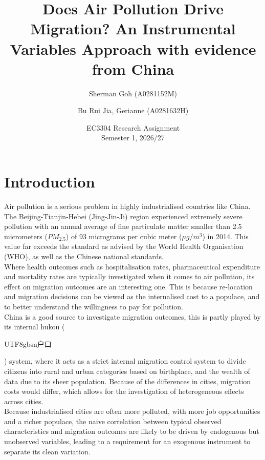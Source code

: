 \documentclass[11pt,twocolumn]{article}
\title{Does Air Pollution Drive Migration? An Instrumental Variables Approach with evidence from China}
\author{Sherman Goh (A0281152M) \and Bu Rui Jia, Gerianne (A0281632H)}
\date{EC3304 Research Assignment \\ Semester 1, 2026/27}
\begin{document}
\maketitle

\section{Introduction}

Air pollution is a serious problem in highly industrialised countries like China. The Beijing-Tianjin-Hebei (Jing-Jin-Ji) region experienced extremely severe pollution with an annual average of fine particulate matter smaller than 2.5 micrometers ($PM_{2.5}$) of 93 micrograms per cubic meter ($\mu g/m^3$) in 2014. This value far exceeds the standard as advised by the World Health Organisation (WHO), as well as the Chinese national standards. \citep{worldbank2020china}\\

\noindent  Where health outcomes such as hospitalisation rates, pharmaceutical expenditure and mortality rates \citep{schlenker2016airports, deschenes2017defensive} are typically investigated when it comes to air pollution, its effect on migration outcomes are an interesting one. This is because re-location and migration decisions can be viewed as the internalised cost to a populace, and to better understand the willingness to pay for pollution.\citep{chen2022pollution}\\

\noindent China is a good source to investigate migration outcomes, this is partly played by its internal hukou (\begin{CJK*}{UTF8}{gbsn}户口\end{CJK*}) system, where it acts as a strict internal migration control system to divide citizens into rural and urban categories based on birthplace, and the wealth of data due to its sheer population. Because of the differences in cities, migration costs would differ, which allows for the investigation of heterogeneous effects across cities.\\

\noindent Because industrialised cities are often more polluted, with more job opportunities and a richer populace, the naive correlation between typical observed characteristics and migration outcomes are likely to be driven by endogenous  but unobserved variables, leading to a requirement for an exogenous instrument to separate its clean variation.\\
\end{document}
